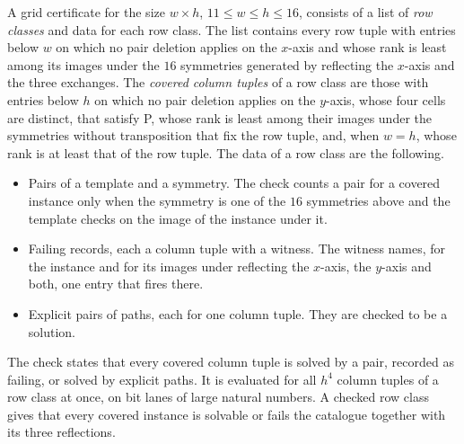 \documentclass[11pt]{article}
\begin{document}
A grid certificate for the size $w\times h$, $11\le w\le h\le 16$, consists of a list of
\emph{row classes} and data for each row class. The list contains every row tuple with entries
below $w$ on which no pair deletion applies on the $x$-axis and whose rank is least among its
images under the $16$ symmetries generated by reflecting the $x$-axis and the three exchanges. The
\emph{covered column tuples} of a row class are those with entries below $h$ on which no pair
deletion applies on the $y$-axis, whose four cells are distinct, that satisfy P, whose rank is
least among their images under the symmetries without transposition that fix the row tuple, and,
when $w=h$, whose rank is at least that of the row tuple. The data of a row class are the
following.
\begin{itemize}
\item Pairs of a template and a symmetry. The check counts a pair for a covered instance only
  when the symmetry is one of the $16$ symmetries above and the template checks on the image of
  the instance under it.
\item Failing records, each a column tuple with a witness. The witness names, for the instance and
  for its images under reflecting the $x$-axis, the $y$-axis and both, one entry that fires there.
\item Explicit pairs of paths, each for one column tuple. They are checked to be a solution.
\end{itemize}
The check states that every covered column tuple is solved by a pair, recorded as failing, or
solved by explicit paths. It is evaluated for all $h^4$ column tuples of a row class at once, on
bit lanes of large natural numbers. A checked row class gives that every covered instance is
solvable or fails the catalogue together with its three reflections.
\end{document}
